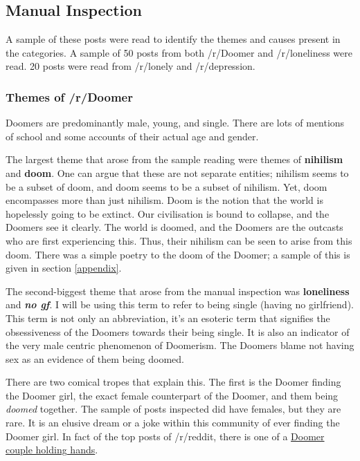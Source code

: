 \documentclass[../report.tex]{subfiles}
\begin{document}
\subsection{Manual Inspection}
A sample of these posts were read to identify the themes and causes present in the categories.
A sample of 50 posts from both /r/Doomer and /r/loneliness were read. 
20 posts were read from /r/lonely and /r/depression.

\subsubsection{Themes of /r/Doomer}
Doomers are predominantly male, young, and single. 
There are lots of mentions of school and some accounts of their actual age and gender. 

The largest theme that arose from the sample reading were themes of \textbf{nihilism} and \textbf{doom}. 
One can argue that these are not separate entities; nihilism seems to be a subset of doom, and doom seems to be a subset of nihilism.
Yet, doom encompasses more than just nihilism.
Doom is the notion that the world is hopelessly going to be extinct. 
Our civilisation is bound to collapse, and the Doomers see it clearly.
The world is doomed, and the Doomers are the outcasts who are first experiencing this. 
Thus, their nihilism can be seen to arise from this doom. 
There was a simple poetry to the doom of the Doomer; a sample of this is given in section \ref{appendix}.

The second-biggest theme that arose from the manual inspection was \textbf{loneliness} and \textbf{\textit{no gf}}. 
I will be using this term to refer to being single (having no girlfriend).
This term is not only an abbreviation, it's an esoteric term that signifies the obsessiveness of the Doomers towards their being single.
It is also an indicator of the very male centric phenomenon of Doomerism.
The Doomers blame not having sex as an evidence of them being doomed. 

There are two comical tropes that explain this. 
The first is the Doomer finding the Doomer girl, the exact female counterpart of the Doomer, and them being \textit{doomed} together. 
The sample of posts inspected did have females, but they are rare. 
It is an elusive dream or a joke within this community of ever finding the Doomer girl. 
In fact of the top posts of /r/reddit, there is one of a
\href{https://www.reddit.com/r/doomer/comments/m4j3xm/no_longer_doing_night_walks_alone/}{Doomer couple holding hands}.
\end{document}
